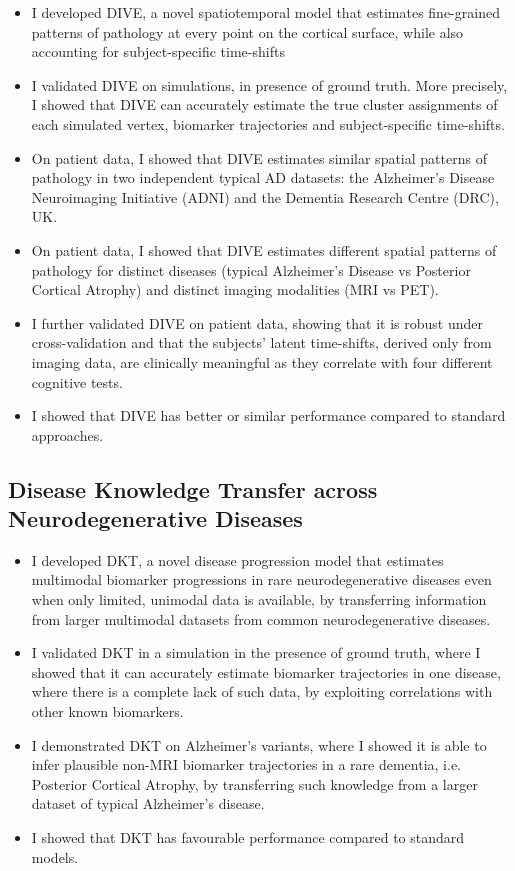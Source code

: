 \begin{itemize}
\item I developed DIVE, a novel spatiotemporal model that estimates fine-grained patterns of pathology at every point on the cortical surface, while also accounting for subject-specific time-shifts
\item I validated DIVE on simulations, in presence of ground truth. More precisely, I showed that DIVE can accurately estimate the true cluster assignments of each simulated vertex, biomarker trajectories and subject-specific time-shifts.
\item On patient data, I showed that DIVE estimates similar spatial patterns of pathology in two independent typical AD datasets: the Alzheimer's Disease Neuroimaging Initiative (ADNI) and the Dementia Research Centre (DRC), UK.
\item On patient data, I showed that DIVE estimates different spatial patterns of pathology for distinct diseases (typical Alzheimer's Disease vs Posterior Cortical Atrophy) and distinct imaging modalities (MRI vs PET).
\item I further validated DIVE on patient data, showing that it is robust under cross-validation and that the subjects' latent time-shifts, derived only from imaging data, are clinically meaningful as they correlate with four different cognitive tests.
\item I showed that DIVE has better or similar performance compared to standard approaches. 
\end{itemize}
 
\subsection{Disease Knowledge Transfer across Neurodegenerative Diseases}
\begin{itemize}
\item I developed DKT, a novel disease progression model that estimates multimodal biomarker progressions in rare neurodegenerative diseases even when only limited, unimodal data is available, by transferring information from larger multimodal datasets from common neurodegenerative diseases.
\item I validated DKT in a simulation in the presence of ground truth, where I showed that it can accurately estimate biomarker trajectories in one disease, where there is a complete lack of such data, by exploiting correlations with other known biomarkers.
\item I demonstrated DKT on Alzheimer's variants, where I showed it is able to infer plausible non-MRI biomarker trajectories in a rare dementia, i.e. Posterior Cortical Atrophy, by transferring such knowledge from a larger dataset of typical Alzheimer's disease.
\item I showed that DKT has favourable performance compared to standard models.
\end{itemize}
 
